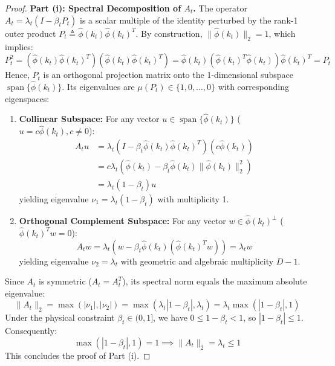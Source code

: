 \begin{proof}
\textbf{Part (i): Spectral Decomposition of $A_t$.}
The operator $A_t = \lambda_t (I - \beta_t P_t)$ is a scalar multiple of the identity perturbed by the rank-1 outer product $P_t \triangleq \hat{\phi}(k_t) \hat{\phi}(k_t)^T$. By construction, $\|\hat{\phi}(k_t)\|_2 = 1$, which implies:
\begin{equation}
P_t^2 = \left(\hat{\phi}(k_t) \hat{\phi}(k_t)^T\right) \left(\hat{\phi}(k_t) \hat{\phi}(k_t)^T\right) = \hat{\phi}(k_t) \left(\hat{\phi}(k_t)^T \hat{\phi}(k_t)\right) \hat{\phi}(k_t)^T = P_t
\end{equation}
Hence, $P_t$ is an orthogonal projection matrix onto the 1-dimensional subspace $\operatorname{span}\{\hat{\phi}(k_t)\}$. Its eigenvalues are $\mu(P_t) \in \{1, 0, \dots, 0\}$ with corresponding eigenspaces:
\begin{enumerate}
    \item \textbf{Collinear Subspace:} For any vector $u \in \operatorname{span}\{\hat{\phi}(k_t)\}$ ($u = c \hat{\phi}(k_t), c \neq 0$):
    \begin{align}
    A_t u &= \lambda_t \left( I - \beta_t \hat{\phi}(k_t) \hat{\phi}(k_t)^T \right) \left( c \hat{\phi}(k_t) \right) \nonumber \\
          &= c \lambda_t \left( \hat{\phi}(k_t) - \beta_t \hat{\phi}(k_t) \|\hat{\phi}(k_t)\|_2^2 \right) \nonumber \\
          &= \lambda_t (1 - \beta_t) u
    \end{align}
    yielding eigenvalue $\nu_1 = \lambda_t (1 - \beta_t)$ with multiplicity 1.
    \item \textbf{Orthogonal Complement Subspace:} For any vector $w \in \hat{\phi}(k_t)^\perp$ ($\hat{\phi}(k_t)^T w = 0$):
    \begin{equation}
    A_t w = \lambda_t \left( w - \beta_t \hat{\phi}(k_t) (\hat{\phi}(k_t)^T w) \right) = \lambda_t w
    \end{equation}
    yielding eigenvalue $\nu_2 = \lambda_t$ with geometric and algebraic multiplicity $D - 1$.
\end{enumerate}
Since $A_t$ is symmetric ($A_t = A_t^T$), its spectral norm equals the maximum absolute eigenvalue:
\begin{equation}
\|A_t\|_2 = \max\left( |\nu_1|, |\nu_2| \right) = \max\left( \lambda_t |1 - \beta_t|, \lambda_t \right) = \lambda_t \max\left( |1 - \beta_t|, 1 \right)
\end{equation}
Under the physical constraint $\beta_t \in (0, 1]$, we have $0 \le 1 - \beta_t < 1$, so $|1 - \beta_t| \le 1$. Consequently:
\begin{equation}
\max\left( |1 - \beta_t|, 1 \right) = 1 \implies \|A_t\|_2 = \lambda_t \le 1
\end{equation}
This concludes the proof of Part (i).


\end{proof}

